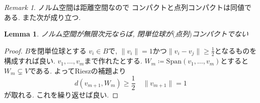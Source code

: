 \documentclass[dvipdfmx,a4paper,11pt]{article} %
\newtheorem{lem}[thm]{Lemma}
\theoremstyle{definition}
\theoremstyle{remark}
\newtheorem{rem}[thm]{Remark}
\numberwithin{equation}{section}
\begin{document}
\begin{rem}
\label{rem-norm-cpt}
ノルム空間は距離空間なので
コンパクトと点列コンパクトは同値である. 
また次が成り立つ. 
\begin{lem}
ノルム空間が無限次元ならば, 閉単位球が$($点列$)$コンパクトでない
\end{lem}
\begin{proof}
$B$を閉単位球とする
$v_i \in B$で, $\lVert v_i\rVert =1$かつ$\lVert v_i - v_j \rVert \geq \frac{1}{2}$となるものを構成すれば良い. 
$v_1, \ldots, v_m$まで作れたとする. 
$W_m \coloneqq  \mathrm{Span}(v_1, \ldots, v_m)$とすると$W_m \subsetneq V$である. 
よってRieszの補題より
\[
d(v_{m+1}, W_m) \geq \frac{1}{2} \quad \lVert v_{m+1}\rVert =1
\]
が取れる. これを繰り返せば良い. 
\end{proof}
\end{rem}
\end{document}
